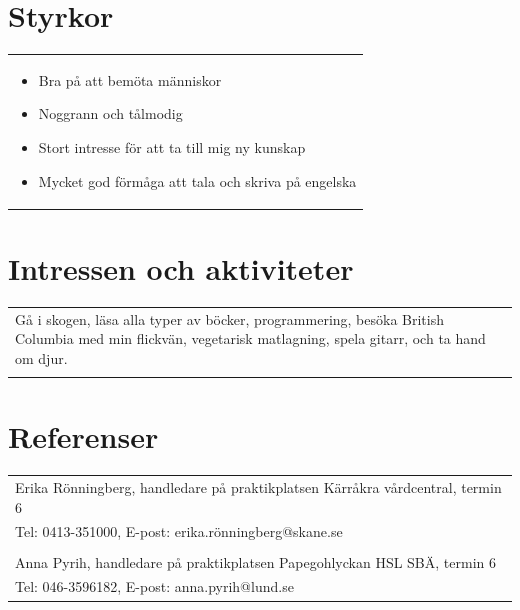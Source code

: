 \documentclass[11pt,a4paper]{article}
\begin{document}
\section{Styrkor}
\begin{tabularx}{\textwidth}{X}
	\vspace{-7pt}
	\begin{itemize}[leftmargin=0.8em]
		\item Bra på att bemöta människor
		\item Noggrann och tålmodig
		\item Stort intresse för att ta till mig ny kunskap
		\item Mycket god förmåga att tala och skriva på engelska
	\end{itemize}
\end{tabularx}

\section{Intressen och aktiviteter}
\begin{tabularx}{\textwidth}{X}
Gå i skogen, läsa alla typer av böcker, programmering, besöka British Columbia med min flickvän, vegetarisk matlagning, spela gitarr, och ta hand om djur.\\
\\
\end{tabularx}


\section{Referenser}
\begin{tabularx}{\textwidth}{X}
Erika Rönningberg, handledare på praktikplatsen Kärråkra vårdcentral, termin 6 \\ Tel: 0413-351000, E-post: erika.rönningberg@skane.se \\
\\
Anna Pyrih, handledare på praktikplatsen Papegohlyckan HSL SBÄ, termin 6\\ Tel: 046-3596182, E-post: anna.pyrih@lund.se \\
\end{tabularx}
\end{document}
